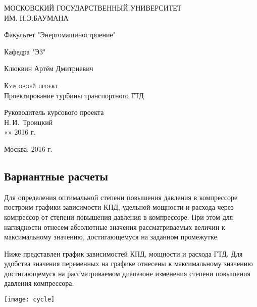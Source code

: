 \documentclass{article}
\begin{document}
\begin{titlepage}
  \begin{center}
    МОСКОВСКИЙ ГОСУДАРСТВЕННЫЙ УНИВЕРСИТЕТ \\ ИМ. Н.Э.БАУМАНА
    \vspace{0.25cm}

    Факультет "Энергомашиностроение"

    Кафедра "Э3"
    \vfill


    Клюквин Артём Дмитриевич
    \vfill

    \textsc{Курсовоей проект}\\[5mm]

    {\LARGE Проектирование турбины транспортного ГТД}
\end{center}
\vfill

\newlength{\ML}
\hfill\begin{minipage}{0.4\textwidth}
  Руководитель курсового проекта\\
  \underline{\hspace{\ML}} Н.\,И.~Троицкий\\
  «\underline{\hspace{0.7cm}}» \underline{\hspace{2cm}} 2016 г.
\end{minipage}%
\bigskip

\vfill

\begin{center}
  Москва, 2016 г.
\end{center}
\end{titlepage}



\subsection{Вариантные расчеты}
Для определения оптимальной степени повышения давления в компрессоре построим графики зависимости КПД, удельной мощности и расхода через компрессор от степени повышения давления в компрессоре. При этом для наглядности отнесем абсолютные значения рассматриваемых величин к максимальному значению, достигающемуся на заданном промежутке.

Ниже представлен график зависимостей КПД, мощности и расхода ГТД. Для удобства значения переменных на графике отнесены к максимальному значению достигающемуся на рассматриваемом диапазоне изменения степени повышения давления компрессора:
\begin{center}
	\texttt{[image: cycle]}
\end{center}
\end{document}
